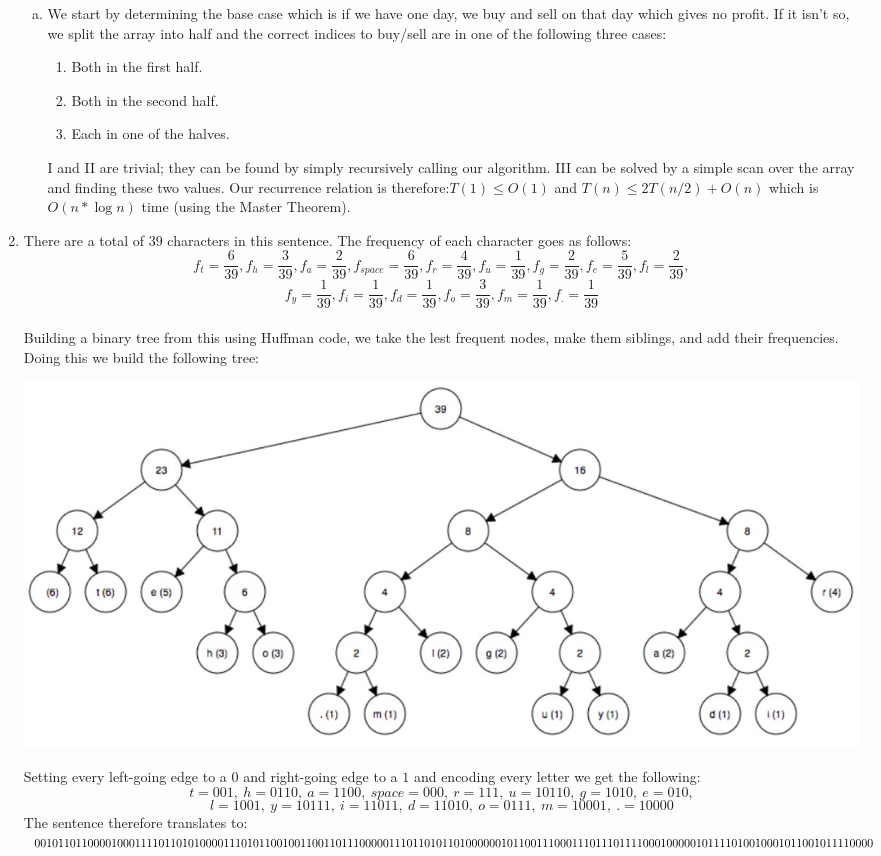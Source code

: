 \begin{enumerate}[1.]
\begin{enumerate}[(a)]
	\item
	We start by determining the base case which is if we have one day, we buy and sell on that day which gives no profit. If it isn't so, we split the array into half and the correct indices to buy/sell are in one of the following  three cases:
	\begin{enumerate}[I]
	\item Both in the first half.
	\item Both in the second half.
	\item Each in one of the halves.
	\end{enumerate}
	I and II are trivial; they can be found by simply recursively calling our algorithm. III can be solved by a simple scan over the array and finding these two values. Our recurrence relation is therefore:$T(1)\leq O(1)$ and $T(n) \leq 2T(n / 2) + O(n)$ which is $O(n*\log n)$ time (using the Master Theorem). 
	

	\end{enumerate}
	
\item There are a total of $39$ characters in this sentence. The frequency of each character goes as follows:\\
$$f_t=\frac{6}{39}, f_h=\frac{3}{39}, f_a=\frac{2}{39}, f_{space}=\frac{6}{39}, f_r=\frac{4}{39}, f_u=\frac{1}{39}, f_g=\frac{2}{39}, f_e=\frac{5}{39}, f_l=\frac{2}{39}, $$$$f_y=\frac{1}{39},f_i=\frac{1}{39}, f_d=\frac{1}{39}, f_o=\frac{3}{39}, f_m=\frac{1}{39}, f_.=\frac{1}{39}$$\\Building a binary tree from this using Huffman code, we take the lest frequent nodes, make them siblings, and add their frequencies. Doing this we build the following tree:

\includegraphics[width=\textwidth]{Huff}

Setting every left-going edge to a $0$ and right-going edge to a $1$ and encoding every letter we get the following:
$$t= 001,\ h=0110,\ a=1100,\ space=000,\ r=111,\ u=10110,\ g=1010,\ e=010,$$$$ l=1001,\ y=10111,\ i=11011,\ d=11010,\ o=0111,\ m=10001,\ .=10000$$
The sentence therefore translates to: \\
$001011011000010001111011010100001110101100100110011011100000111011010110100\\ 0000101100111000111011101111000100000101111010010001011001011110000$\\


\end{enumerate}
